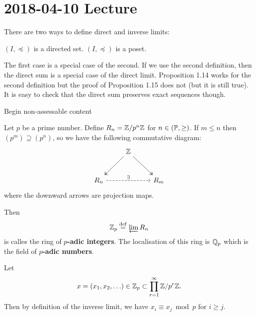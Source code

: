 \section{2018-04-10 Lecture}

\begin{rmk}
	There are two ways to define direct and inverse limits:
	\begin{enum}
		\io $(I,\preceq)$ is a directed set.
		\io $(I,\preceq)$ is a poset.
	\end{enum}
	The first case is a special case of the second.
	If we use the second definition, then the direct sum is a special case of the direct limit.
	Proposition 1.14 works for the second definition but the proof of Proposition 1.15 does not (but it is still true).
	It is easy to check that the direct sum preserves exact sequences though.
\end{rmk}

Begin non-assessable content
\begin{defn}
	Let $p$ be a prime number.
	Define $R_n = \mathbb{Z}/p^n\mathbb{Z}$ for $n \in (\mathbb{P},\geq)$.
	If $m \leq n$ then $(p^m) \supseteq (p^n)$, so we have the following commutative diagram:
	\[\begin{tikzcd}[row sep=large]
		& \ZZ \ar[rd, twoheadrightarrow] \ar[ld, twoheadrightarrow] & \\
		R_n \ar[rr, "\exists", dashed] & & R_m
	\end{tikzcd}\]
	where the downward arrows are projection maps.
	
	Then
	\[\mathbb{Z}_p \overset{\mathrm{def}}{=} \varprojlim R_n\]
	is calles the ring of \textbf{$p$-adic integers}.
	The localisation of this ring is $\mathbb{Q}_p$ which is the field of \textbf{$p$-adic numbers}.
	
	Let
	\[x = (x_1,x_2,\ldots) \in \mathbb{Z}_p \subset \prod_{r=1}^\infty \mathbb{Z}/p^r\mathbb{Z}.\]
	Then by definition of the inverse limit, we have $x_i \equiv x_j \bmod p$ for $i \geq j$.
\end{defn}

